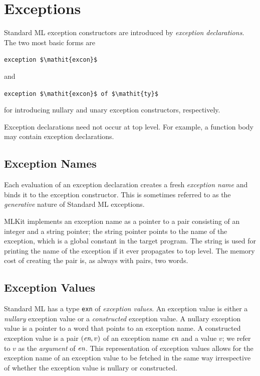 \documentclass[12pt]{book}
\begin{document}
\chapter{Exceptions}
\label{exceptions.sec}

Standard ML
%
%
%
%
exception constructors are introduced by
%
%
%
%
{\em exception declarations}. The two most basic forms are
\begin{center}
  \lstinline!exception $\mathit{excon}$!
\end{center}
and
\begin{center}
  \lstinline!exception $\mathit{excon}$ of $\mathit{ty}$!
\end{center}
for introducing nullary and unary exception constructors, respectively.

Exception declarations need not occur at top level. For example, a function body
may contain exception declarations.

\section{Exception Names}
Each evaluation of an exception declaration creates a fresh
%
%
%
%
{\em exception name\/} and binds it to the exception constructor. This is
sometimes referred to as the {\em generative\/} nature of Standard ML
exceptions.

MLKit implements an exception name as a pointer to a pair
consisting of an integer and a string pointer; the string pointer
points to the name of the exception, which is a global constant in the
target program. The string is used for printing the name of the
exception if it ever propagates to top level. The memory cost of
creating the pair is, as always with pairs, two words.

\section{Exception Values}

Standard ML has a type
%
%
%
{\tt exn} of
%
%
%
{\em exception values}.  An exception value is either a
%
%
%
{\em nullary\/} exception value or a
%
%
%
{\em constructed\/} exception value. A nullary exception value is a pointer to a
word that points to an exception name. A constructed exception value is a pair
$(\hbox{\it en},v)$ of an exception name $\hbox{\it en}$ and a value $v$; we refer to $v$ as
the {\em argument\/} of $\hbox{\it en}$.  This representation of exception values
allows for the exception name of an exception value to be fetched in the same
way irrespective of whether the exception value is nullary or constructed.
\end{document}
